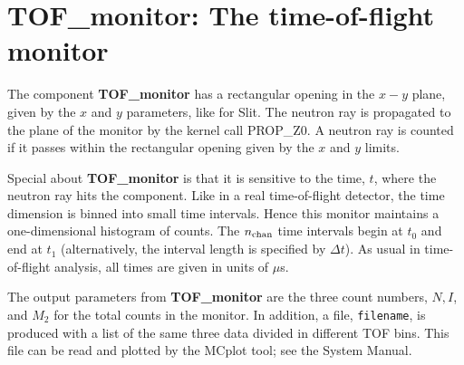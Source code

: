 \section{TOF\_monitor: The time-of-flight monitor}

The component {\bf TOF\_monitor} has a rectangular opening
in the $x-y$ plane, given by the $x$ and $y$ parameters,
like for {\rm Slit}.
The neutron ray is propagated to the plane of the monitor
by the kernel call PROP\_Z0.
A neutron ray is counted if it passes within the rectangular opening 
given by the $x$ and $y$ limits.

Special about {\bf TOF\_monitor} is that it is sensitive to
the time, $t$, where the neutron ray hits the component.
Like in a real time-of-flight detector, the time dimension is
binned into small time intervals.
Hence this monitor maintains a one-dimensional histogram of counts.
The $n_{\rm chan}$ time intervals begin at $t_0$ and
end at $t_1$ (alternatively, the interval length is specified by $\Delta t$).
As usual in time-of-flight analysis, all times are given in units of $\mu$s.

The output parameters from {\bf TOF\_monitor} are the three count numbers,
$N, I$, and $M_2$ for the total counts in the monitor.
In addition, a file, \verb+filename+, is produced with a list of 
the same three data divided in different TOF bins.
This file can be read and plotted by the {\rm MCplot} tool; see the
System Manual.

